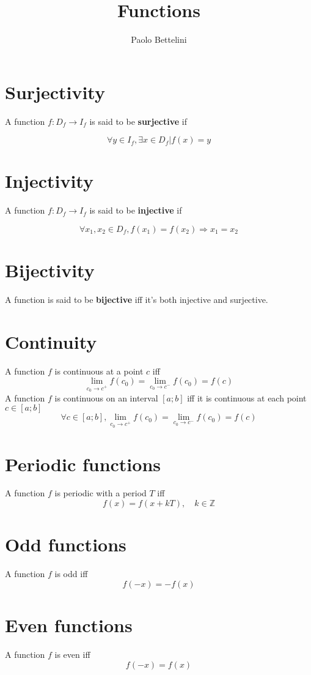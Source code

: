 \documentclass{article}
\title{Functions}
\author{Paolo Bettelini}
\date{}
\begin{document}
\maketitle
\tableofcontents
\pagebreak

\section{Surjectivity}

A function \(f:D_f \to I_f\) is said to be \textbf{surjective} if

\[
    \forall y \in I_f, \exists x \in D_f | f(x) = y
\]

\section{Injectivity}

A function \(f:D_f \to I_f\) is said to be \textbf{injective} if

\[
    \forall x_1, x_2 \in D_f, f(x_1) = f(x_2) \Rightarrow x_1 = x_2 
\]

\section{Bijectivity}

A function is said to be \textbf{bijective} iff it's both injective
and surjective.

\section{Continuity}

A function \(f\) is continuous at a point \(c\) iff
\[
    \lim_{c_0 \to c^+} f(c_0) = \lim_{c_0 \to c^-} f(c_0) = f(c)
\]
A function \(f\) is continuous on an interval \([a;b]\) iff it is continuous at each point \(c \in [a;b]\)
\[
    \forall c \in [a;b],
    \lim_{c_0 \to c^+} f(c_0) = \lim_{c_0 \to c^-} f(c_0) = f(c)
\]

\section{Periodic functions}

A function \(f\) is periodic with a period \(T\) iff
\[
    f(x) = f(x + kT), \quad k \in \mathbb{Z}
\]

\section{Odd functions}

A function \(f\) is odd iff
\[
    f(-x) = -f(x)
\]

\section{Even functions}

A function \(f\) is even iff
\[
    f(-x) = f(x)
\]
\end{document}
